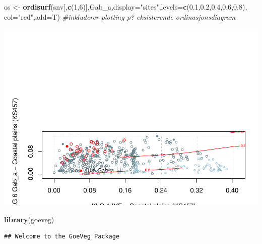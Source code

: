 \documentclass[]{article}
\newenvironment{Shaded}{\begin{snugshade}}{\end{snugshade}}
\newcommand{\CommentTok}[1]{\textcolor[rgb]{0.56,0.35,0.01}{\textit{#1}}}
\newcommand{\DataTypeTok}[1]{\textcolor[rgb]{0.13,0.29,0.53}{#1}}
\newcommand{\DecValTok}[1]{\textcolor[rgb]{0.00,0.00,0.81}{#1}}
\newcommand{\FloatTok}[1]{\textcolor[rgb]{0.00,0.00,0.81}{#1}}
\newcommand{\KeywordTok}[1]{\textcolor[rgb]{0.13,0.29,0.53}{\textbf{#1}}}
\newcommand{\NormalTok}[1]{#1}
\newcommand{\StringTok}[1]{\textcolor[rgb]{0.31,0.60,0.02}{#1}}
\begin{document}
\begin{Shaded}
\begin{Highlighting}[]
\NormalTok{os <-}\StringTok{ }\KeywordTok{ordisurf}\NormalTok{(snv[,}\KeywordTok{c}\NormalTok{(}\DecValTok{1}\NormalTok{,}\DecValTok{6}\NormalTok{)],Gab_a,}\DataTypeTok{display=}\StringTok{"sites"}\NormalTok{,}\DataTypeTok{levels=}\KeywordTok{c}\NormalTok{(}\FloatTok{0.1}\NormalTok{,}\FloatTok{0.2}\NormalTok{,}\FloatTok{0.4}\NormalTok{,}\FloatTok{0.6}\NormalTok{,}\FloatTok{0.8}\NormalTok{), }\DataTypeTok{col=}\StringTok{"red"}\NormalTok{,}\DataTypeTok{add=}\NormalTok{T) }\CommentTok{#inkluderer plotting p? eksisterende ordinasjonsdiagram}
\end{Highlighting}
\end{Shaded}

\includegraphics{Landscape_analysis_example_4_files/figure-latex/unnamed-chunk-53-1.pdf}

\begin{Shaded}
\begin{Highlighting}[]
\KeywordTok{library}\NormalTok{(goeveg)}
\end{Highlighting}
\end{Shaded}

\begin{verbatim}
## Welcome to the GoeVeg Package
\end{verbatim}
\end{document}
